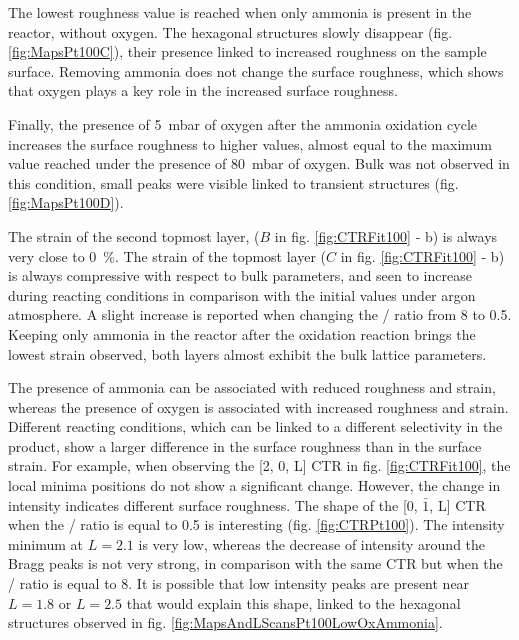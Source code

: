 The lowest roughness value is reached when only ammonia is present in the reactor, without oxygen.
The hexagonal structures slowly disappear (fig. \ref{fig:MapsPt100C}), their presence linked to increased roughness on the sample surface.
Removing ammonia does not change the surface roughness, which shows that oxygen plays a key role in the increased surface roughness.

Finally, the presence of \qty{5}{\milli\bar} of oxygen after the ammonia oxidation cycle increases the surface roughness to higher values, almost equal to the maximum value reached under the presence of \qty{80}{\milli\bar} of oxygen.
Bulk  was not observed in this condition, small peaks were visible linked to transient structures (fig. \ref{fig:MapsPt100D}).

The strain of the second topmost layer, ($B$ in fig. \ref{fig:CTRFit100} - b) is always very close to \qty{0}{\percent}.
The strain of the topmost layer ($C$ in fig. \ref{fig:CTRFit100} - b) is always compressive with respect to bulk parameters, and seen to increase during reacting conditions in comparison with the initial values under argon atmosphere.
A slight increase is reported when changing the / ratio from \num{8} to \num{0.5}.
Keeping only ammonia in the reactor after the oxidation reaction brings the lowest strain observed, both layers almost exhibit the bulk lattice parameters.

The presence of ammonia can be associated with reduced roughness and strain, whereas the presence of oxygen is associated with increased roughness and strain.
Different reacting conditions, which can be linked to a different selectivity in the product, show a larger difference in the surface roughness than in the surface strain.
For example, when observing the [2, 0, L] CTR in fig. \ref{fig:CTRFit100}, the local minima positions do not show a significant change.
However, the change in intensity indicates different surface roughness.
The shape of the [0, $\bar{1}$, L] CTR when the / ratio is equal to \num{0.5} is interesting (fig. \ref{fig:CTRPt100}).
The intensity minimum at $L=2.1$ is very low, whereas the decrease of intensity around the Bragg peaks is not very strong, in comparison with the same CTR but when the / ratio is equal to \num{8}.
It is possible that low intensity peaks are present near $L=1.8$ or $L=2.5$ that would explain this shape, linked to the hexagonal structures observed in fig. \ref{fig:MapsAndLScansPt100LowOxAmmonia}.

